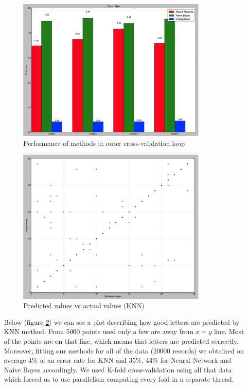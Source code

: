 \begin{figure}[!t]
	\centering
	\includegraphics[width=0.85\textwidth]{figures/performance}
	\caption{Performance of methods in outer cross-validation loop}
	\label{fig:performance}
\end{figure} 
\begin{figure}[!t]
	\centering
	\includegraphics[width=0.85\textwidth]{figures/predictions}
	\caption{Predicted values vs actual values (KNN)}
	\label{fig:predictions}
\end{figure}
Below (figure \ref{fig:predictions}) we can see a plot describing how good letters are predicted by KNN method. 
From 5000 points used only a few are away from $x=y$ line. Most of the points are on that line, which means that
letters are predicted correctly. \\

Moreover, fitting our methods for all of the data (20000 records) we obtained on average 4\% of an error rate for KNN and 35\%, 44\% 
for Neural Network and Naive Bayes accordingly. We used K-fold cross-validation using all that data which forced us to use parallelism
computing every fold in a separate thread. 

